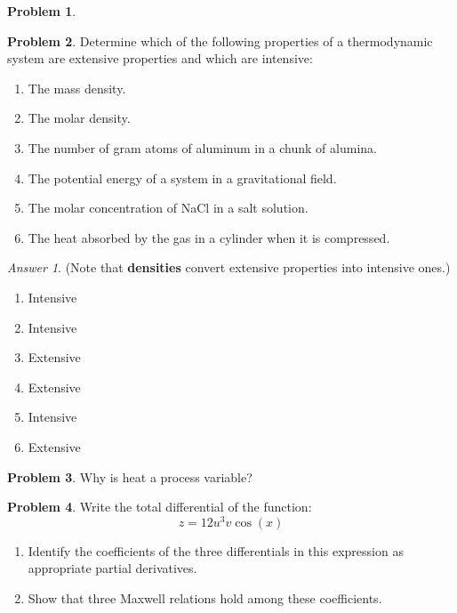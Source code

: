 \documentclass[a4paper, 12pt]{article}
\theoremstyle{definition}
\newtheorem{problem}{Problem}[section]
\theoremstyle{remark}
\newtheorem*{answer}{Answer}
\begin{document}
\begin{problem}
\end{problem}

\begin{problem}
    Determine which of the following properties of a thermodynamic system are
    extensive properties and which are intensive:
    \begin{enumerate}
        \item The mass density.
        \item The molar density.
        \item The number of gram atoms of aluminum in a chunk of alumina.
        \item The potential energy of a system in a gravitational field.
        \item The molar concentration of NaCl in a salt solution.
        \item The heat absorbed by the gas in a cylinder when it is compressed.
    \end{enumerate}
\end{problem}

\begin{answer}
    (Note that \textbf{densities} convert extensive properties into
    intensive ones.)
    \begin{enumerate}
        \item Intensive
        \item Intensive
        \item Extensive
        \item Extensive
        \item Intensive
        \item Extensive
    \end{enumerate}
\end{answer}

\begin{problem}
    Why is heat a process variable?
\end{problem}

\begin{problem}
    Write the total differential of the function:
    \[ z = 12 u^3 v \cos(x) \]

    \begin{enumerate}
        \item Identify the coefficients of the three differentials in this
            expression as appropriate partial derivatives.
        \item Show that three Maxwell relations hold among these coefficients.
    \end{enumerate}
\end{problem}
\end{document}

